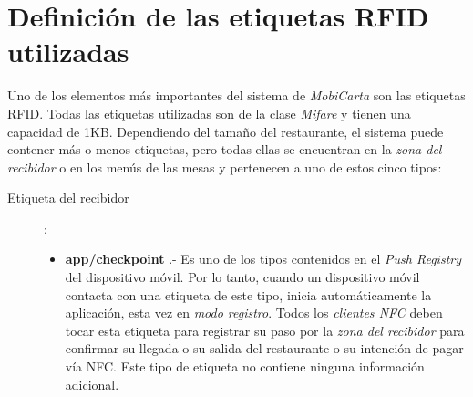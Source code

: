 \chapter{Definición de las etiquetas \acs{RFID} utilizadas}
\label{chap:tags}
Uno de los elementos más importantes del sistema de \emph{MobiCarta} son las etiquetas \acs{RFID}. Todas las etiquetas utilizadas son de la clase
\emph{Mifare} y tienen una capacidad de 1KB. Dependiendo del tamaño del
restaurante, el sistema puede contener más o menos etiquetas, pero todas ellas
se encuentran en la \emph{zona del recibidor} o en los menús de las mesas y 
pertenecen a uno de estos cinco tipos:
\begin{description}
\item[Etiqueta del recibidor]:
  \begin{itemize}
  \item \textbf{app/checkpoint} .- Es uno de los tipos contenidos en el
  \emph{Push Registry} del dispositivo móvil. Por lo tanto, cuando un
  dispositivo móvil contacta con una etiqueta de este tipo, inicia 
  automáticamente la aplicación, esta vez en \emph{modo registro}. Todos los 
  \emph{clientes \acs{NFC}} deben tocar esta etiqueta para registrar su paso
  por la \emph{zona del recibidor} para confirmar su llegada o su salida del 
  restaurante o su intención de pagar vía \acs{NFC}. Este tipo de etiqueta no 
  contiene ninguna información adicional.
  \end{itemize}


\end{description}
